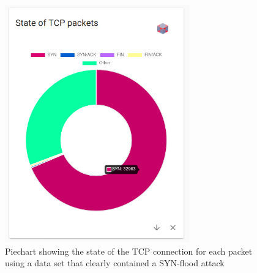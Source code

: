 \begin{figure}
    \centering
    \includegraphics[width=8cm]{images/evaluation-synflood-piechart.png}
    \caption{Piechart showing the state of the TCP connection for each packet using a data set that clearly contained a SYN-flood attack}
    \label{fig:synfloodpiechart}
\end{figure}

